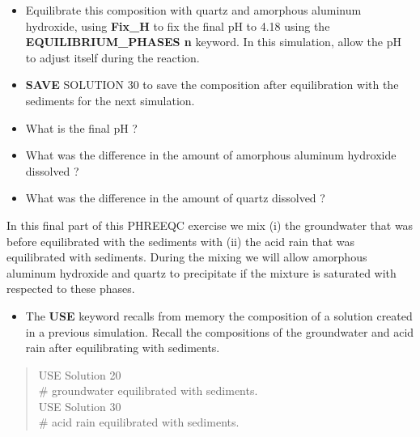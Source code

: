\begin{itemize}

\item Equilibrate this composition with quartz and amorphous aluminum hydroxide, 
using \textbf{Fix\_H} to fix the final pH to 4.18 using the {\color{red}\textbf{EQUILIBRIUM\_PHASES n}}
keyword. In this simulation, allow the pH to adjust itself during the reaction.

\item {\color{red}\textbf{SAVE} SOLUTION 30} to save the composition after equilibration 
with the sediments for the next simulation.

\item What is the final pH ?

\item What was the difference in the amount of amorphous aluminum hydroxide dissolved ?

\item What was the difference in the amount of quartz dissolved ?
\end{itemize}

In this final part of this PHREEQC exercise we mix (i) the groundwater that was before equilibrated 
with the sediments with (ii) the acid rain that was equilibrated with sediments. 
During the mixing we will allow amorphous aluminum hydroxide and quartz 
to precipitate if the mixture is saturated with respected to these phases.

\begin {itemize}
\item The {\color{red}\textbf{USE}} keyword recalls from memory the composition 
of a solution created in a previous simulation.  
Recall the compositions of the groundwater and acid rain after equilibrating with sediments.
\end{itemize}


\begin{quote}
{\color{red}USE	Solution 20  \\
\# groundwater equilibrated with sediments. \\
USE	Solution 30  \\
\# acid rain equilibrated with sediments. }\\
\end{quote}

